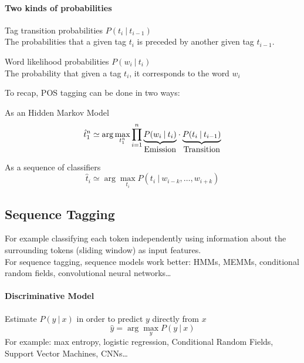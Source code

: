 \documentclass[10pt]{report}
\begin{document}
\paragraph{Two kinds of probabilities}
\begin{list}{}{}
	\item Tag transition probabilities $P(t_i\:|\:t_{i-1})$\\
	The probabilities that a given tag $t_i$ is preceded by another given tag $t_{i-1}$.
	\item Word likelihood probabilities $P(w_i\:|\:t_i)$\\
	The probability that given a tag $t_i$, it corresponds to the word $w_i$
\end{list}
To recap, POS tagging can be done in two ways:
\begin{list}{}{}
	\item As an Hidden Markov Model $$\hat{t}_1^n \simeq \arg\max_{t_1^n}\prod_{i=1}^n\underset{\hbox{Emission}}{\underbrace{P(w_i\:|\:t_i)}}\cdot \underset{\hbox{Transition}}{\underbrace{P(t_i\:|\:t_{i-1})}}$$ 
	\item As a sequence of classifiers $$\hat{t}_i \simeq \arg\max_{t_i}P(t_i\:|\:w_{i-k},\ldots,w_{i+k})$$
\end{list}
\subsection{Sequence Tagging} For example classifying each token independently using information about the surrounding tokens (sliding window) as input features.\\
For sequence tagging, sequence models work better: HMMs, MEMMs, conditional random fields, convolutional neural networks\ldots
\paragraph{Discriminative Model} Estimate $P(y\:|\:x)$ in order to predict $y$ directly from $x$
$$\hat{y}=\arg\max_y P(y\:|\:x)$$
For example: max entropy, logistic regression, Conditional Random Fields, Support Vector Machines, CNNs\ldots
\end{document}
